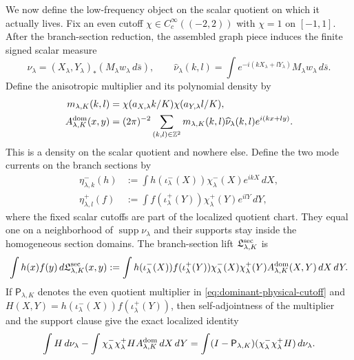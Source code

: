 \documentclass[11pt]{article}
\begin{document}
We now define the low-frequency object on the scalar quotient on which it
actually lives.  Fix an even cutoff $\chi\in C_c^\infty((-2,2))$ with
$\chi=1$ on $[-1,1]$.  After the branch-section reduction, the assembled
graph piece induces the finite signed scalar measure
\begin{equation}
\label{eq:dominant-pushforward-measure}
 \nu_\lambda=(X_\lambda,Y_\lambda)_*
       (M_\lambda w_\lambda\,d\bar s),\qquad
 \widehat\nu_\lambda(k,l)=
 \int e^{-i(kX_\lambda+lY_\lambda)}M_\lambda w_\lambda\,d\bar s .
\end{equation}
Define the anisotropic multiplier and its polynomial density by
\begin{align}
 m_{\lambda,K}(k,l)
 &=\chi(a_{X,\lambda}k/K)\chi(a_{Y,\lambda}l/K),
 \label{eq:dominant-physical-cutoff}\\
 A_{\lambda,K}^{\rm dom}(x,y)
 &=(2\pi)^{-2}\sum_{(k,l)\in\mathbb Z^2}
 m_{\lambda,K}(k,l)\widehat\nu_\lambda(k,l)e^{i(kx+ly)}.
 \label{eq:canonical-dominant-polynomial}
\end{align}
This is a density on the scalar quotient and nowhere else.  Define the two
mode currents on the branch sections by
\begin{align}
 \eta^-_{\lambda,k}(h)
 &:=\int h(\iota^-_\lambda(X))\chi^-_\lambda(X)e^{ikX}\,dX,
 \label{eq:past-section-mode-current}\\
 \eta^+_{\lambda,l}(f)
 &:=\int f(\iota^+_\lambda(Y))\chi^+_\lambda(Y)e^{ilY}\,dY,
 \label{eq:future-section-mode-current}
\end{align}
where the fixed scalar cutoffs are part of the localized quotient chart.
They equal one on a neighborhood of
$\operatorname{supp}\nu_\lambda$ and their supports stay inside the
homogeneous section domains.
The branch-section lift $\mathfrak L^{\rm sec}_{\lambda,K}$ is
\begin{equation}
\label{eq:section-lifted-low-block}
 \int h(x)f(y)\,d\mathfrak L^{\rm sec}_{\lambda,K}(x,y)
 :=\int h(\iota^-_\lambda(X))f(\iota^+_\lambda(Y))
       \chi^-_\lambda(X)\chi^+_\lambda(Y)
       A_{\lambda,K}^{\rm dom}(X,Y)\,dX\,dY.
\end{equation}
If $\mathsf P_{\lambda,K}$ denotes the even quotient multiplier in
\eqref{eq:dominant-physical-cutoff} and
$H(X,Y)=h(\iota^-_\lambda(X))f(\iota^+_\lambda(Y))$, then self-adjointness of
the multiplier and the support clause give the exact localized identity
\begin{equation}
\label{eq:section-quotient-low-high}
 \int H\,d\nu_\lambda-
 \int \chi^-_\lambda\chi^+_\lambda H A_{\lambda,K}^{\rm dom}\,dX\,dY
 =\int (I-\mathsf P_{\lambda,K})
       (\chi^-_\lambda\chi^+_\lambda H)\,d\nu_\lambda.
\end{equation}
\end{document}
